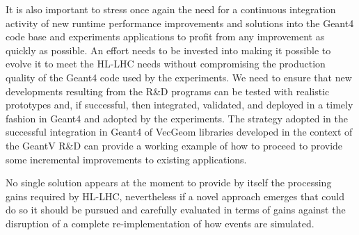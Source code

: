 It is also important to stress once again the need for a continuous
integration activity of new runtime performance
improvements and solutions into the Geant4 code base and experiments
applications to profit from any improvement as quickly as possible. An
effort needs to be invested into making it possible to evolve it to meet
the HL-LHC needs without compromising the production quality of the
Geant4 code used by the experiments. We need to ensure that new
developments resulting from the R\&D programs can be tested with
realistic prototypes and, if successful, then integrated, validated, and
deployed in a timely fashion in Geant4 and adopted by the experiments.
The strategy adopted in the successful integration in Geant4 of VecGeom
libraries developed in the context of the GeantV R\&D can provide a
working example of how to proceed to provide some incremental
improvements to existing applications.

No single solution appears at the moment to provide by itself the
processing gains required by HL-LHC, nevertheless if a novel approach
emerges that could do so it should be pursued and carefully evaluated in
terms of gains against the disruption of a complete re-implementation of
how events are simulated.
